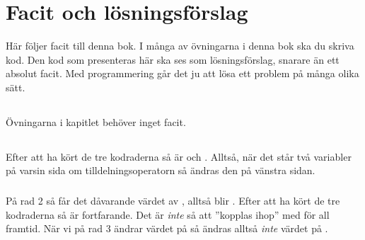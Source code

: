 %
%

\chapter{Facit och lösningsförslag}\label{ch:facit}
Här följer facit till denna bok. I många av övningarna i denna bok ska du skriva kod. Den kod som presenteras här ska ses som lösningsförslag, snarare än ett absolut facit. Med programmering går det ju att lösa ett problem på många olika sätt.

\section*{}

Övningarna i kapitlet behöver inget facit.


\section*{}

\subsection*{}
Efter att ha kört de tre kodraderna så är  och . Alltså, när det står två variabler på varsin sida om tilldelningsoperatorn så ändras den på vänstra sidan.

\subsection*{}
På rad 2 så får  det dåvarande värdet av , alltså blir . Efter att ha kört de tre kodraderna så är  fortfarande. Det är \emph{inte} så att  ''kopplas ihop'' med  för all framtid. När vi på rad 3 ändrar värdet på  så ändras alltså \emph{inte} värdet på .

